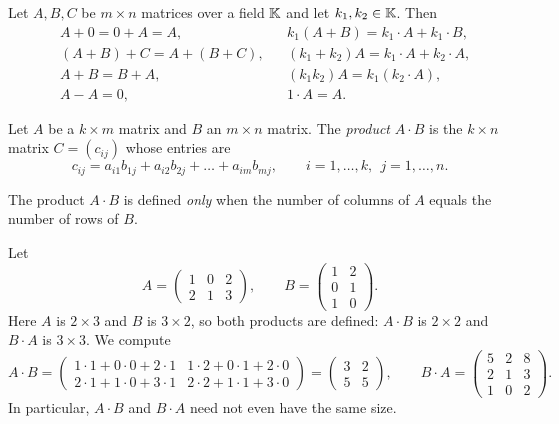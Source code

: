 \begin{theorem}
Let $A,B,C$ be $m\times n$ matrices over a field $\mathbb{K}$ and let $k_1,k_2\in \mathbb{K}$. Then
\[
\begin{aligned}
&A+0 = 0+A =A, &&k_1(A+B) = k_1\cdot A+k_1\cdot B,\\
&(A+B)+C = A+(B+C), &&(k_1+k_2)A = k_1\cdot A+k_2\cdot A,\\
&A+B = B+A, &&(k_1 k_2)A = k_1(k_2\cdot A),\\
&A-A = 0, && 1\cdot A = A.
\end{aligned}
\]
\end{theorem}

\begin{definition}
Let $A$ be a $k\times m$ matrix and $B$ an $m\times n$ matrix. The \emph{product} $A\cdot B$ is the
$k\times n$ matrix $C=(c_{ij})$ whose entries are
\[
c_{ij} = a_{i1}b_{1j}+a_{i2}b_{2j}+\ldots + a_{im}b_{mj}, \qquad i=1,\ldots,k,\ \ j=1,\ldots,n.
\]
\end{definition}

\begin{warning}
The product $A\cdot B$ is defined \emph{only} when the number of columns of $A$ equals the number of rows of
$B$.
\end{warning}

\begin{example}
Let
\[
A = \left( \begin{array}{ccc} 1 & 0 & 2 \\ 2 & 1 & 3 \end{array} \right), \qquad
B = \left( \begin{array}{cc} 1 & 2 \\ 0 & 1 \\ 1 & 0 \end{array} \right).
\]
Here $A$ is $2\times 3$ and $B$ is $3\times 2$, so both products are defined: $A\cdot B$ is $2\times 2$ and
$B\cdot A$ is $3\times 3$. We compute
\[
A\cdot B = \left( \begin{array}{cc}
1\cdot 1+0\cdot 0+2\cdot 1 & 1\cdot 2+0\cdot 1+2\cdot 0 \\
2\cdot 1+1\cdot 0+3\cdot 1 & 2\cdot 2+1\cdot 1+3\cdot 0
\end{array} \right)
= \left( \begin{array}{cc} 3 & 2 \\ 5 & 5 \end{array} \right),
\qquad
B\cdot A = \left( \begin{array}{ccc} 5 & 2 & 8 \\ 2 & 1 & 3 \\ 1 & 0 & 2 \end{array} \right).
\]
In particular, $A\cdot B$ and $B\cdot A$ need not even have the same size.
\end{example}

